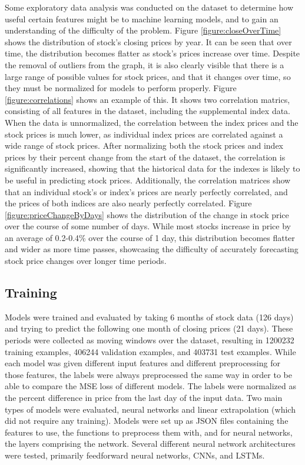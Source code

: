 \documentclass[conference]{IEEEtran}
\begin{document}
Some exploratory data analysis was conducted on the dataset to determine how useful certain features might be to machine learning models, and to gain an understanding of the difficulty of the problem. Figure \ref{figure:closeOverTime} shows the distribution of stock's closing prices by year. It can be seen that over time, the distribution becomes flatter as stock's prices increase over time. Despite the removal of outliers from the graph, it is also clearly visible that there is a large range of possible values for stock prices, and that it changes over time, so they must be normalized for models to perform properly. Figure \ref{figure:correlations} shows an example of this. It shows two correlation matrics, consisting of all features in the dataset, including the supplemental index data. When the data is unnormalized, the correlation between the index prices and the stock prices is much lower, as individual index prices are correlated against a wide range of stock prices. After normalizing both the stock prices and index prices by their percent change from the start of the dataset, the correlation is significantly increased, showing that the historical data for the indexes is likely to be useful in predicting stock prices. Additionally, the correlation matrices show that an individual stock's or index's prices are nearly perfectly correlated, and the prices of both indices are also nearly perfectly correlated. Figure \ref{figure:priceChangeByDays} shows the distribution of the change in stock price over the course of some number of days. While most stocks increase in price by an average of 0.2-0.4\% over the course of 1 day, this distribution becomes flatter and wider as more time passes, showcasing the difficulty of accurately forecasting stock price changes over longer time periods.

\subsection{Training}
Models were trained and evaluated by taking 6 months of stock data (126 days) and trying to predict the following one month of closing prices (21 days). These periods were collected as moving windows over the dataset, resulting in 1200232 training examples, 406244 validation examples, and 403731 test examples. While each model was given different input features and different preprocessing for those features, the labels were always preprocessed the same way in order to be able to compare the MSE loss of different models. The labels were normalized as the percent difference in price from the last day of the input data. Two main types of models were evaluated, neural networks and linear extrapolation (which did not require any training). Models were set up as JSON files containing the features to use, the functions to preprocess them with, and for neural networks, the layers comprising the network. Several different neural network architectures were tested, primarily feedforward neural networks, CNNs, and LSTMs.
\end{document}
